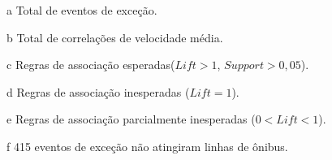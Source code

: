 \documentclass[
	12pt,				%
	oneside,			%
	a4paper,			%
	english,			%
	brazil				%
	]{abntex2ppgsi}
\begin{document}
{{{\begin{apendicesenv}
\begin{table}[!htb]
\begin{threeparttable}
\begin{tablenotes}
            \item[a] Total de eventos de exceção.
            \item[b] Total de correlações de velocidade média.
            \item[c] Regras de associação esperadas($Lift > 1$, $Support > 0,05$).
            \item[d] Regras de associação inesperadas ($Lift = 1$).
            \item[e] Regras de associação parcialmente inesperadas ($0 < Lift < 1$).
            \item[f] 415 eventos de exceção não atingiram linhas de ônibus.
        \end{tablenotes}
\end{threeparttable}
\end{table}


\end{apendicesenv}}}}
\end{document}
